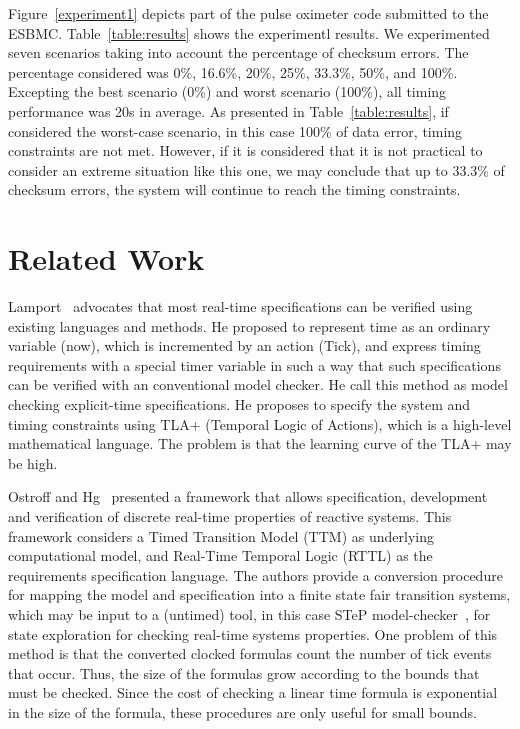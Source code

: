 \documentclass{llncs}
\begin{document}
Figure~\ref{experiment1} depicts part of the pulse oximeter code submitted to the ESBMC. 
Table~\ref{table:results} shows the experimentl results. 
We experimented seven scenarios taking into account the percentage of checksum errors.
The percentage considered was 0\%, 16.6\%, 20\%, 25\%, 33.3\%, 50\%, and 100\%.
Excepting the best scenario (0\%) and worst scenario (100\%), all timing performance was 20s in average.
As presented in Table~\ref{table:results}, if considered the worst-case scenario, 
in this case 100\% of data error, timing constraints are not met. 
However, if it is considered that it is not practical to consider an extreme situation like this one, 
we may conclude that up to 33.3\% of checksum errors, 
the system will continue to reach the timing constraints.



\section{Related Work}

Lamport~\cite{Lamport05} advocates that most real-time specifications can be verified using existing languages 
and methods. 
He proposed to represent time as an ordinary variable (now), which is incremented by an action (Tick), 
and express timing requirements 
with a special timer variable in such a way that such specifications can be verified 
with an conventional model checker. 
He call this method as model checking explicit-time specifications. 
He proposes to specify the system and timing constraints using TLA+ (Temporal Logic of Actions),
which is a high-level mathematical language. 
The problem is that the learning curve of the TLA+ may be high.

Ostroff and Hg~\cite{Ostroff96} presented a framework that allows specification, development and verification 
of discrete real-time properties of reactive systems. This framework considers a Timed Transition Model (TTM)
as underlying computational model, and Real-Time Temporal Logic (RTTL)
as the requirements specification language.
The authors provide a conversion procedure for mapping the model and specification into a finite state fair
transition systems, which may be input to a (untimed) tool, in this case STeP model-checker~\cite{Bjorner00}, 
for state exploration for checking real-time systems properties.
One problem of this method is that the converted clocked formulas count the number of tick events that occur. 
Thus, the size of the formulas grow according to the bounds that must be checked.
Since the cost of checking a linear time formula is exponential in the size of 
the formula, these procedures are only useful for small bounds.
\end{document}
